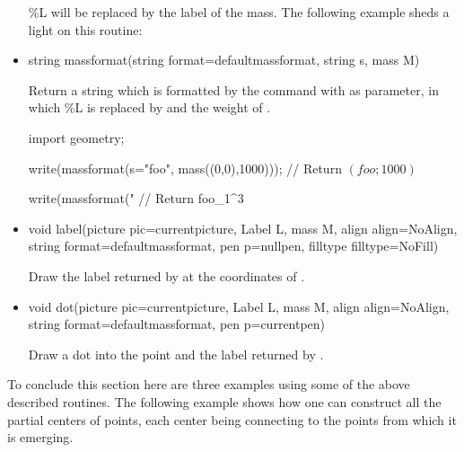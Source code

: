 \documentclass[pdftex]{article}
\begin{document}
\begin{itemize}
  \%L will be replaced by the label of the mass. The following
  example sheds a light on this routine:
  \vspace*{2mm}
\item {}
  \begin{Vcolor}
    string massformat(string format=defaultmassformat,
    string s, mass M)
  \end{Vcolor}
  Return a string which is formatted by the command 
  with  as parameter, in which \%L is replaced
  by  and the weight of .
  \begin{Vcolor}
    import geometry;

    write(massformat(s="foo", mass((0,0),1000)));
    // Return $\left(foo;1000\right)$


    write(massformat("%
    // Return foo\_1\!\times{}^{3\phantom{+}}

  \end{Vcolor}
  \vspace*{2mm}
\item {}
  \begin{Vcolor}
    void label(picture pic=currentpicture, Label L, mass M,
    align align=NoAlign, string format=defaultmassformat,
    pen p=nullpen, filltype filltype=NoFill)
  \end{Vcolor}
  Draw the label returned by  at the coordinates of .
\item {}
  \begin{Vcolor}
    void dot(picture pic=currentpicture, Label L, mass M, align align=NoAlign,
    string format=defaultmassformat, pen p=currentpen)
  \end{Vcolor}
  Draw a dot into the point  and the label returned by  .
\end{itemize}

To conclude this section here are three examples using some of the
above described routines.
The following example shows how one can construct all the partial
centers of  points, each center being connecting to the
points from which it is emerging.
\end{document}
